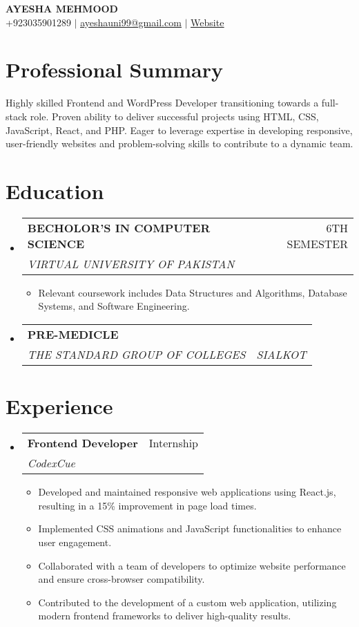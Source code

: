 \documentclass[letterpaper,11pt]{article}
\makeatletter
\newcommand{\resumeItem}[1]{
  \item\small{
    {#1 \vspace{-2pt}}
  }
}
\newcommand{\resumeSubheading}[4]{
  \vspace{-2pt}\item
    \begin{tabular*}{0.97\textwidth}[t]{l@{\extracolsep{\fill}}r}
      \textbf{#1} & #2 \\
      \textit{\small#3} & \textit{\small #4} \\
    \end{tabular*}\vspace{-7pt}
}
\newcommand{\resumeSubHeadingListStart}{\begin{itemize}[leftmargin=0.15in, label={}]}
\newcommand{\resumeSubHeadingListEnd}{\end{itemize}}
\newcommand{\resumeItemListStart}{\begin{itemize}}
\newcommand{\resumeItemListEnd}{\end{itemize}\vspace{-5pt}}
\makeatother
\begin{document}
\begin{center}
    \textbf{\Huge \scshape AYESHA MEHMOOD} \\ \vspace{1pt}
    \small +923035901289 $|$ \href{mailto:ayeshauni99@gmail.com}{\underline{ayeshauni99@gmail.com}} $|$ \href{https://ayeshamehmood.netlify.app/}{\underline{Website}}
\end{center}

\section{Professional Summary}
 \begin{itemize}[leftmargin=0.15in, label={}]
    \small{\item{
     Highly skilled Frontend and WordPress Developer transitioning towards a full-stack role. Proven ability to deliver successful projects using HTML, CSS, JavaScript, React, and PHP. Eager to leverage expertise in developing responsive, user-friendly websites and problem-solving skills to contribute to a dynamic team.
    }}
 \end{itemize}

\section{Education}
  \resumeSubHeadingListStart
    \resumeSubheading
      {BECHOLOR’S IN COMPUTER SCIENCE}{6TH SEMESTER}
      {VIRTUAL UNIVERSITY OF PAKISTAN}{}
      \resumeItemListStart
        \resumeItem{Relevant coursework includes Data Structures and Algorithms, Database Systems, and Software Engineering.}
      \resumeItemListEnd
    \resumeSubheading
      {PRE-MEDICLE}{}
      {THE STANDARD GROUP OF COLLEGES}{SIALKOT}
  \resumeSubHeadingListEnd

\section{Experience}
  \resumeSubHeadingListStart
    \resumeSubheading
      {Frontend Developer}{Internship}
      {CodexCue}{}
      \resumeItemListStart
        \resumeItem{Developed and maintained responsive web applications using React.js, resulting in a 15\% improvement in page load times.}
        \resumeItem{Implemented CSS animations and JavaScript functionalities to enhance user engagement.}
        \resumeItem{Collaborated with a team of developers to optimize website performance and ensure cross-browser compatibility.}
        \resumeItem{Contributed to the development of a custom web application, utilizing modern frontend frameworks to deliver high-quality results.}
      \resumeItemListEnd
  \resumeSubHeadingListEnd
\end{document}
